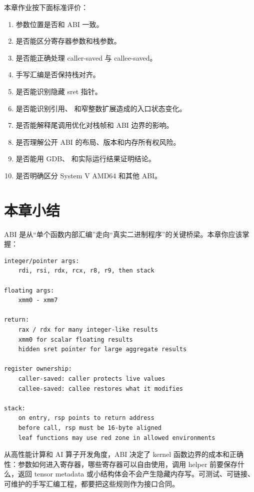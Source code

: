 \begin{exercisebox}
本章作业按下面标准评价：

\begin{enumerate}
  \item 参数位置是否和 ABI 一致。
  \item 是否能区分寄存器参数和栈参数。
  \item 是否能正确处理 caller-saved 与 callee-saved。
  \item 手写汇编是否保持栈对齐。
  \item 是否能识别隐藏 sret 指针。
  \item 是否能识别引用、 和窄整数扩展造成的入口状态变化。
  \item 是否能解释尾调用优化对栈帧和 ABI 边界的影响。
  \item 是否理解公开 ABI 的布局、版本和内存所有权风险。
  \item 是否能用 GDB、 和实际运行结果证明结论。
  \item 是否明确区分 System V AMD64 和其他 ABI。
\end{enumerate}
\end{exercisebox}

\section{本章小结}

ABI 是从“单个函数内部汇编”走向“真实二进制程序”的关键桥梁。本章你应该掌握：

\begin{lstlisting}
integer/pointer args:
    rdi, rsi, rdx, rcx, r8, r9, then stack

floating args:
    xmm0 - xmm7

return:
    rax / rdx for many integer-like results
    xmm0 for scalar floating results
    hidden sret pointer for large aggregate results

register ownership:
    caller-saved: caller protects live values
    callee-saved: callee restores what it modifies

stack:
    on entry, rsp points to return address
    before call, rsp must be 16-byte aligned
    leaf functions may use red zone in allowed environments
\end{lstlisting}

从高性能计算和 AI 算子开发角度，ABI 决定了 kernel 函数边界的成本和正确性：参数如何进入寄存器，哪些寄存器可以自由使用，调用 helper 前要保存什么，返回 tensor metadata 或小结构体会不会产生隐藏内存写。可测试、可链接、可维护的手写汇编工程，都要把这些规则作为接口合同。

